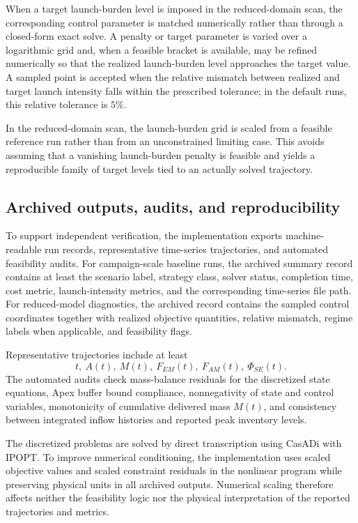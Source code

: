 \documentclass[12pt]{article}
\begin{document}
When a target launch-burden level is imposed in the reduced-domain scan, the corresponding control parameter is matched numerically rather than through a closed-form exact solve. A penalty or target parameter is varied over a logarithmic grid and, when a feasible bracket is available, may be refined numerically so that the realized launch-burden level approaches the target value. A sampled point is accepted when the relative mismatch between realized and target launch intensity falls within the prescribed tolerance; in the default runs, this relative tolerance is $5\%$.

In the reduced-domain scan, the launch-burden grid is scaled from a feasible reference run rather than from an unconstrained limiting case. This avoids assuming that a vanishing launch-burden penalty is feasible and yields a reproducible family of target levels tied to an actually solved trajectory.

\subsection{Archived outputs, audits, and reproducibility}
\label{app:reproducibility}

To support independent verification, the implementation exports machine-readable run records, representative time-series trajectories, and automated feasibility audits. For campaign-scale baseline runs, the archived summary record contains at least the scenario label, strategy class, solver status, completion time, cost metric, launch-intensity metrics, and the corresponding time-series file path. For reduced-model diagnostics, the archived record contains the sampled control coordinates together with realized objective quantities, relative mismatch, regime labels when applicable, and feasibility flags.

Representative trajectories include at least
\[
t,\ A(t),\ M(t),\ F_{EM}(t),\ F_{AM}(t),\ \Phi_{SE}(t).
\]
The automated audits check mass-balance residuals for the discretized state equations, Apex buffer bound compliance, nonnegativity of state and control variables, monotonicity of cumulative delivered mass $M(t)$, and consistency between integrated inflow histories and reported peak inventory levels.

The discretized problems are solved by direct transcription using CasADi with IPOPT. To improve numerical conditioning, the implementation uses scaled objective values and scaled constraint residuals in the nonlinear program while preserving physical units in all archived outputs. Numerical scaling therefore affects neither the feasibility logic nor the physical interpretation of the reported trajectories and metrics.
\end{document}
